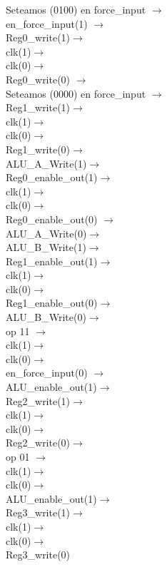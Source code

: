 \documentclass{article}
\begin{document}
\begin{enumerate}
    Seteamos (0100) en force\_input $\rightarrow$\\
    en\_force\_input(1) $\rightarrow$\\
    Reg0\_write(1)$\rightarrow$\\
    clk(1)$\rightarrow$\\
    clk(0)$\rightarrow$\\
    Reg0\_write(0) $\rightarrow$\\
    Seteamos (0000) en force\_input $\rightarrow$\\
    Reg1\_write(1)$\rightarrow$\\
    clk(1)$\rightarrow$\\
    clk(0)$\rightarrow$\\
    Reg1\_write(0)$\rightarrow$\\
    ALU\_A\_Write(1)$\rightarrow$\\
    Reg0\_enable\_out(1)$\rightarrow$\\
    clk(1)$\rightarrow$\\
    clk(0)$\rightarrow$\\
    Reg0\_enable\_out(0) $\rightarrow$\\
    ALU\_A\_Write(0)$\rightarrow$\\
    ALU\_B\_Write(1)$\rightarrow$\\
    Reg1\_enable\_out(1)$\rightarrow$\\
    clk(1)$\rightarrow$\\ clk(0)$\rightarrow$\\
    Reg1\_enable\_out(0)$\rightarrow$\\
    ALU\_B\_Write(0)$\rightarrow$\\
    op 11 $\rightarrow$\\
    clk(1)$\rightarrow$\\
    clk(0)$\rightarrow$\\
    en\_force\_input(0) $\rightarrow$\\
    ALU\_enable\_out(1)$\rightarrow$\\
    Reg2\_write(1)$\rightarrow$\\
    clk(1)$\rightarrow$\\
    clk(0)$\rightarrow$\\
    Reg2\_write(0)$\rightarrow$\\
    op 01 $\rightarrow$\\
    clk(1)$\rightarrow$\\
    clk(0)$\rightarrow$\\
    ALU\_enable\_out(1)$\rightarrow$\\
    Reg3\_write(1)$\rightarrow$\\
    clk(1)$\rightarrow$\\
    clk(0)$\rightarrow$\\
    Reg3\_write(0)


\end{enumerate}
\end{document}
